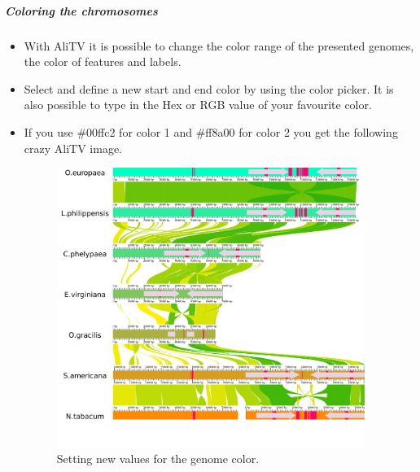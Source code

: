 \documentclass[a4paper]{scrartcl}
\begin{document}
\subparagraph{Coloring the chromosomes}
\begin{itemize}
	\item With AliTV it is possible to change the color range of the presented genomes, the color of features and labels.
	\item Select  and define a new start and end color by using the color picker. It is also possible to type in the Hex or RGB value of your favourite color.
	\item If you use \#00ffc2 for color 1 and \#ff8a00 for color 2 you get the following crazy AliTV image.
	\begin{figure}[H]
		\centering
		\includegraphics[width=10cm]{crazy.png}
		\caption{Setting new values for the genome color.}
	\end{figure}
\end{itemize}
\end{document}
